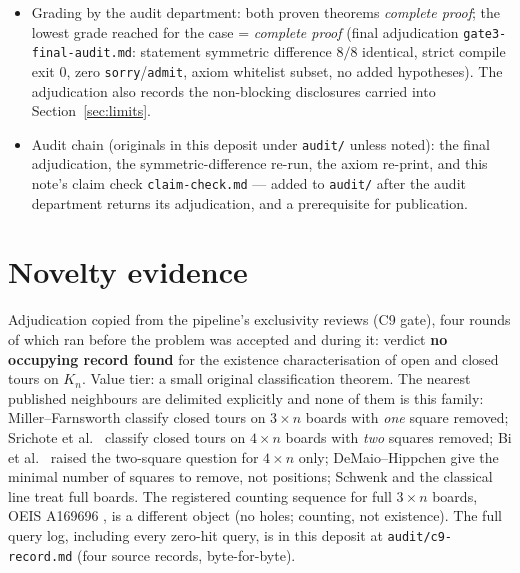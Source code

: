 \documentclass[11pt]{article}
\begin{document}
\begin{itemize}
\begin{lstlisting}[basicstyle=\ttfamily\footnotesize,frame=none]
'no_closed_tour_3' depends on axioms: [propext, Classical.choice, Quot.sound]
'open_tour_1' depends on axioms: [propext, Classical.choice, Quot.sound]
'no_open_tour_0' depends on axioms: [propext, Quot.sound]
'no_closed_tour_0' depends on axioms: [propext, Quot.sound]
'no_closed_tour_4' depends on axioms: [propext, Classical.choice, Quot.sound]
'no_closed_tour_6' depends on axioms: [propext, Classical.choice, Quot.sound]
'exists_hamiltonian_path_iff' depends on axioms: [propext, Classical.choice, Quot.sound]
'exists_hamiltonian_cycle_iff' depends on axioms: [propext, Classical.choice, Quot.sound]
\end{lstlisting}
The two main theorems depend on exactly \{propext, Classical.choice,
Quot.sound\}; every line is a subset of the whitelist.
\item Grading by the audit department: both proven theorems
\emph{complete proof}; the lowest grade reached for the case = \emph{complete
proof} (final adjudication \texttt{gate3-final-audit.md}: statement
symmetric difference $8/8$ identical, strict compile exit $0$, zero
\texttt{sorry}/\texttt{admit}, axiom whitelist subset, no added hypotheses).
The adjudication also records the non-blocking disclosures carried into
Section~\ref{sec:limits}.
\item Audit chain (originals in this deposit under \texttt{audit/} unless
noted): the final adjudication, the symmetric-difference re-run, the axiom
re-print, and this note's claim check \texttt{claim-check.md} --- added to
\texttt{audit/} after the audit department returns its adjudication, and a
prerequisite for publication.
\end{itemize}

\section{Novelty evidence}\label{sec:novelty}

Adjudication copied from the pipeline's exclusivity reviews (C9 gate), four
rounds of which ran before the problem was accepted and during it: verdict
\textbf{no occupying record found} for the existence characterisation of
open and closed tours on $K_n$. Value tier: a small original classification
theorem. The nearest published neighbours are delimited explicitly and none
of them is this family: Miller--Farnsworth \cite{millerfarnsworth} classify
closed tours on $3\times n$ boards with \emph{one} square removed;
Srichote et al.\ \cite{srichote} classify closed tours on $4\times n$ boards
with \emph{two} squares removed; Bi et al.\ \cite{bi} raised the two-square
question for $4\times n$ only; DeMaio--Hippchen \cite{demaio} give the
minimal number of squares to remove, not positions; Schwenk
\cite{schwenk} and the classical line treat full boards. The registered
counting sequence for full $3\times n$ boards, OEIS A169696 \cite{a169696},
is a different object (no holes; counting, not existence). The full query
log, including every zero-hit query, is in this deposit at
\texttt{audit/c9-record.md} (four source records, byte-for-byte).
\end{document}
